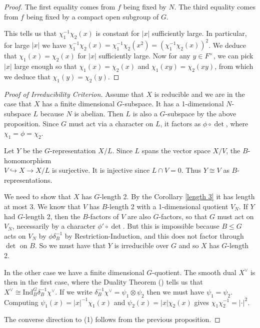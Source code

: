 \begin{proof}
    The first equality comes from $f$ being fixed by $N$. The third equality comes from $f$ being fixed by a compact open subgroup of $G$.

    This tells us that $\chi_1^{-1}\chi_2(x)$ is constant for $|x|$ sufficiently large. In particular, for large $|x|$ we have $\chi_1^{-1}\chi_2(x) = \chi_1^{-1}\chi_2(x^2) = (\chi_1^{-1}\chi_2(x))^2$. We deduce that $\chi_1(x)=\chi_2(x)$ for $|x|$ sufficiently large. Now for any $y \in F^\times$, we can pick $|x|$ large enough so that $\chi_1(x)=\chi_2(x)$ and $\chi_1(xy)=\chi_2(xy)$, from which we deduce that $\chi_1(y)=\chi_2(y)$. 
    
\end{proof}

\begin{proof}[Proof of Irreducibility Criterion]
    Assume that $X$ is reducible and we are in the case that $X$ has a finite dimensional $G$-subspace. It has a 1-dimensional $N$-subspace $L$ because $N$ is abelian. Then $L$ is also a $G$-subspace by the above proposition. Since $G$ must act via a character on $L$, it factors as $\phi \circ \det$, where $\chi_1=\phi=\chi_2$. 

    Let $Y$ be the $G$-representation $X/L$. Since $L$ spans the vector space $X/V$, the $B$-homomorphism \\${V \hookrightarrow X \to X/L}$ is surjective. It is injective since $L \cap V = 0$. Thus $Y \cong V$ as $B$-representations.

    We need to show that $X$ has $G$-length 2. By the Corollary \ref{length 3} it has length at most 3. We know that $V$ has $B$-length 2 with a 1-dimensional quotient $V_N$. If $Y$ had $G$-length 2, then the $B$-factors of $V$ are also $G$-factors, so that $G$ must act on $V_N$, necessarily by a character $\phi' \circ \det$. But this is impossible because $B \leq G$ acts on $V_N$ by $\phi \delta_B^{-1}$ by Restriction-Induction, and this does not factor through $\det$ on $B$. So we must have that $Y$ is irreducible over $G$ and so $X$ has $G$-length 2.

    In the other case we have a finite dimensional $G$-quotient. The smooth dual $X^\vee$ is then in the first case, where the Duality Theorem (\cite[Theorem 3.5]{BH1}) tells us that $X^\vee \cong \mathrm{Ind}_B^G \delta_B^{-1} \chi^\vee$. If we write $\delta_B^{-1} \chi^\vee = \psi_1 \otimes \psi_2$ then we must have $\psi_1 = \psi_2$. Computing $\psi_1(x) = |x|^{-1} \chi_1(x)$ and $\psi_2(x) = |x| \chi_2(x)$ gives $\chi_1\chi_2^{-1} = |\cdot|^2$.

    The converse direction to (1) follows from the previous proposition.
\end{proof}


